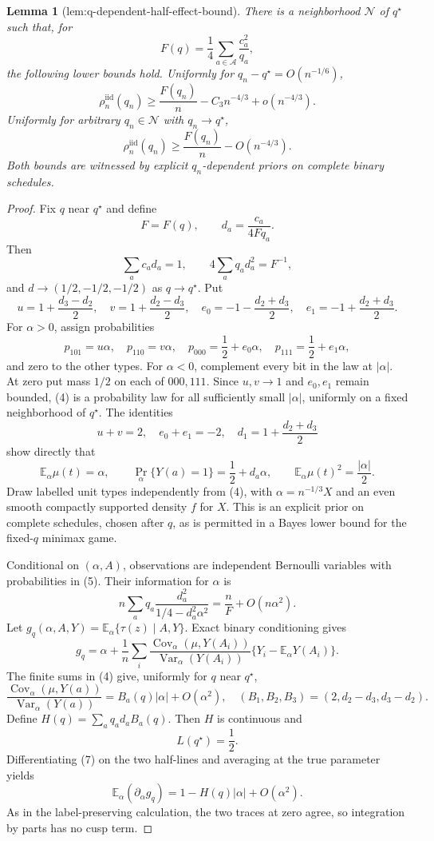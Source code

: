 \documentclass{article}
\newtheorem{lemma}{Lemma}
\begin{document}
\begin{lemma}[lem:q-dependent-half-effect-bound]\label{lem:q-dependent-half-effect-bound}
There is a neighborhood \(\mathcal N\) of \(q^\star\) such that, for
\[
F(q)=\frac14\sum_{a\in\mathcal A}\frac{c_a^2}{q_a},
\]
the following lower bounds hold.  Uniformly for \(q_n-q^\star=O(n^{-1/6})\),
\[
\rho_n^{\mathrm{iid}}(q_n)
\geq \frac{F(q_n)}n-C_3n^{-4/3}+o(n^{-4/3}).
\]
Uniformly for arbitrary \(q_n\in\mathcal N\) with \(q_n\to q^\star\),
\[
\rho_n^{\mathrm{iid}}(q_n)\geq\frac{F(q_n)}n-O(n^{-4/3}).
\]
Both bounds are witnessed by explicit \(q_n\)-dependent priors on complete binary schedules.
\end{lemma}
\begin{proof}
Fix \(q\) near \(q^\star\) and define
\[
F=F(q),\qquad d_a=\frac{c_a}{4Fq_a}.
\]
Then
\[
\sum_ac_ad_a=1,\qquad
4\sum_aq_ad_a^2=F^{-1},
\]
and \(d\to(1/2,-1/2,-1/2)\) as \(q\to q^\star\).  Put
\[
u=1+\frac{d_3-d_2}{2},\quad
v=1+\frac{d_2-d_3}{2},\quad
e_0=-1-\frac{d_2+d_3}{2},\quad
e_1=-1+\frac{d_2+d_3}{2}.
\]
For \(\alpha>0\), assign probabilities
\[
p_{101}=u\alpha,\quad p_{110}=v\alpha,\quad
p_{000}=\frac12+e_0\alpha,\quad
p_{111}=\frac12+e_1\alpha,
\tag{4}
\]
and zero to the other types.  For \(\alpha<0\), complement every bit in the law at \(|\alpha|\).  At zero put mass \(1/2\) on each of \(000,111\).  Since \(u,v\to1\) and \(e_0,e_1\) remain bounded, (4) is a probability law for all sufficiently small \(|\alpha|\), uniformly on a fixed neighborhood of \(q^\star\).  The identities
\[
u+v=2,\quad e_0+e_1=-2,\quad
d_1=1+\frac{d_2+d_3}{2}
\]
show directly that
\[
\mathbb E_\alpha\mu(t)=\alpha,\qquad
\Pr_\alpha\{Y(a)=1\}=\frac12+d_a\alpha,\qquad
\mathbb E_\alpha\mu(t)^2=\frac{|\alpha|}{2}.
\tag{5}
\]
Draw labelled unit types independently from (4), with
\(\alpha=n^{-1/3}X\) and an even smooth compactly supported density \(f\) for \(X\).  This is an explicit prior on complete schedules, chosen after \(q\), as is permitted in a Bayes lower bound for the fixed-\(q\) minimax game.

Conditional on \((\alpha,A)\), observations are independent Bernoulli variables with probabilities in (5).  Their information for \(\alpha\) is
\[
n\sum_aq_a\frac{d_a^2}{1/4-d_a^2\alpha^2}
=\frac nF+O(n\alpha^2).
\tag{6}
\]
Let \(g_q(\alpha,A,Y)=\mathbb E_\alpha\{\tau(z)\mid A,Y\}\).  Exact binary conditioning gives
\[
g_q=\alpha+\frac1n\sum_i
\frac{\operatorname{Cov}_\alpha(\mu,Y(A_i))}
     {\operatorname{Var}_\alpha(Y(A_i))}
\{Y_i-\mathbb E_\alpha Y(A_i)\}.
\tag{7}
\]
The finite sums in (4) give, uniformly for \(q\) near \(q^\star\),
\[
\frac{\operatorname{Cov}_\alpha(\mu,Y(a))}
     {\operatorname{Var}_\alpha(Y(a))}
=B_a(q)|\alpha|+O(\alpha^2),
\quad
(B_1,B_2,B_3)=(2,d_2-d_3,d_3-d_2).
\tag{8}
\]
Define \(H(q)=\sum_aq_ad_aB_a(q)\).  Then \(H\) is continuous and
\[
L(q^\star)=\frac12.
\tag{9}
\]
Differentiating (7) on the two half-lines and averaging at the true parameter yields
\[
\mathbb E_\alpha(\partial_\alpha g_q)
=1-H(q)|\alpha|+O(\alpha^2).
\tag{10}
\]
As in the label-preserving calculation, the two traces at zero agree, so integration by parts has no cusp term.


\end{proof}
\end{document}
